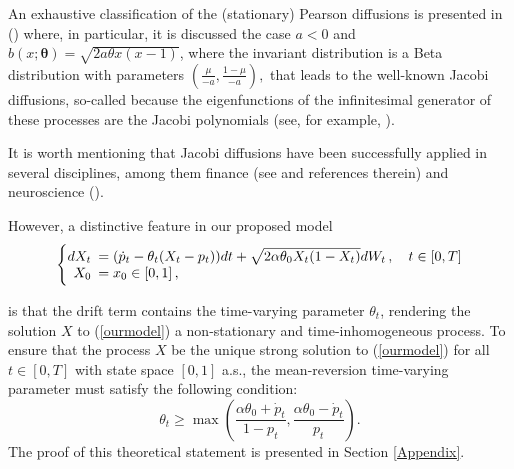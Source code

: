 \documentclass[11pt]{article}
\theoremstyle{definition}
\begin{document}
An exhaustive classification of the (stationary) Pearson diffusions is presented in (\cite[440-443]{foso}) where, in particular, it is discussed the case $a < 0$ and $b(x; \bm{\theta}) = \sqrt{2 a \theta x (x-1)}$, where the invariant distribution is a Beta distribution with parameters $\left( \frac{\mu}{-a}, \frac{1 - \mu}{-a} \right),$ that leads to the well-known Jacobi diffusions, so-called because the eigenfunctions of the infinitesimal generator of these processes are the Jacobi polynomials (see, for example, \cite[2860-2861]{leph}). 

It is worth mentioning that Jacobi diffusions have been successfully applied in several disciplines, among them finance (see \cite{vago} and references therein) and neuroscience (\cite{dotala}).

However, a distinctive feature in our proposed model 
\begin{equation}
  \left\{
  \begin{array}{@{}rl@{}}
    dX_t \!\!\!&= (\dot{p}_t  - \theta_t (X_t - p_t) ) dt +\sqrt{2 \alpha \theta_0 X_t (1 - X_t)} dW_t\,, \quad t \in [0,T]  \\
   X_0  \!\!\!&=  x_0\in [0,1] \,,
 \end{array}\right.  \label{ourmodel}
\end{equation}

is that the drift term contains the time-varying parameter $\theta_t$, rendering the solution $X$ to (\ref{ourmodel}) a non-stationary and time-inhomogeneous process. To ensure that the process $X$ be the unique strong solution to (\ref{ourmodel}) for all $t \in [0,T]$ with state space $[0,1]$ a.s., the mean-reversion time-varying parameter must satisfy the following condition:
\begin{equation}\label{Assumption:3}
\theta_t\geq \max\left(\frac{\alpha\theta_0+\dot p_t}{1-p_t},\frac{\alpha\theta_0-\dot p_t}{p_t}\right)\tag{C}. 
\end{equation} \label{condC}
The proof of this theoretical statement is presented in Section \ref{Appendix}. \\
\end{document}
